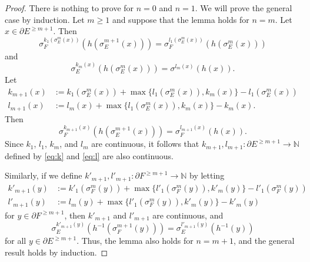 \documentclass[12pt, a4paper]{amsart}
\numberwithin{equation}{section}
\theoremstyle{definition}
\theoremstyle{remark}
\begin{document}
\begin{proof}
	There is nothing to prove for $n=0$ and $n=1$. We will prove the general 
	case by induction. Let $m\ge 1$ and suppose that the lemma holds for 
	$n=m$. Let $x\in\partial E^{\ge m+1}$. Then 
	\begin{equation*}
		\sigma_F^{k_1(\sigma_E^m(x))}(h(\sigma_E^{m+1}(x)))=\sigma_F^{l_1(\sigma_E^m(x))}(h(\sigma_E^m(x)))
	\end{equation*}
	and
	\begin{equation*}
		\sigma_E^{k_m(x)}(h(\sigma_E^m(x)))=\sigma^{l_m(x)}(h(x)). 
	\end{equation*}
	Let 
	\begin{align}
		k_{m+1}(x)&:=k_1(\sigma_E^m(x))+{\operatorname{max}}\{l_1(\sigma_E^m(x)),k_m(x)\}-l_1(\sigma_E^m(x))\label{eq:k}\\
		 l_{m+1}(x)&:=l_m(x)+{\operatorname{max}}\{l_1(\sigma_E^m(x)),k_m(x)\}-k_m(x)\label{eq:l}.
	\end{align}
	Then 
	\begin{equation*}
		\sigma_F^{k_{m+1}(x)}(h(\sigma_E^{m+1}(x)))=\sigma_F^{l_{m+1}(x)}(h(x)).
	\end{equation*}
	Since $k_1$, $l_1$, $k_m$, and $l_m$ are continuous, it follows that 
	$k_{m+1},l_{m+1}:\partial E^{\ge m+1}\to{\mathbb{N}}$ defined by \eqref{eq:k} and 
	\eqref{eq:l} are also continuous.
	
	Similarly, if we define $k'_{m+1},l'_{m+1}:\partial F^{\ge m+1}\to{\mathbb{N}}$ by 
	letting
	\begin{align*}
		k'_{m+1}(y)&:=k'_1(\sigma_F^m(y))+{\operatorname{max}}\{l'_1(\sigma_F^m(y)),k'_m(y)\}-l'_1(\sigma_F^m(y))\\
		 l'_{m+1}(y)&:=l_m(y)+{\operatorname{max}}\{l'_1(\sigma_F^m(y)),k'_m(y)\}-k'_m(y)
	\end{align*}
	for $y\in\partial F^{\ge m+1}$, then $k'_{m+1}$ and $l'_{m+1}$ are 
	continuous, and  
	\begin{equation*}
		\sigma_E^{k'_{m+1}(y)}(h^{-1}(\sigma_F^{m+1}(y)))=\sigma_E^{l'_{m+1}(y)}(h^{-1}(y))
	\end{equation*}
	for all $y\in\partial E^{\ge m+1}$. Thus, the lemma also holds for 
	$n=m+1$, and the general result holds by induction.
\end{proof}
\end{document}
